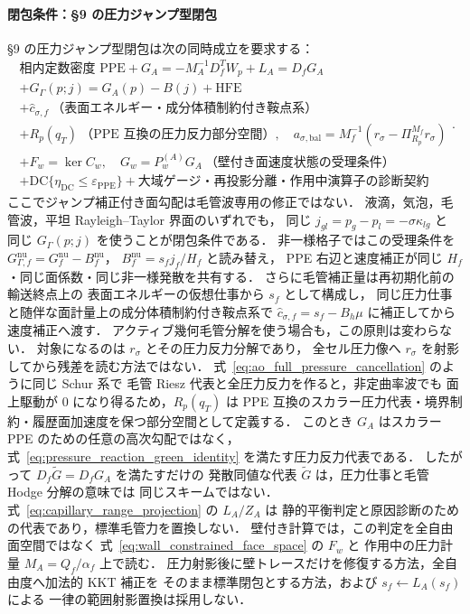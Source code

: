 \paragraph{閉包条件：§9 の圧力ジャンプ型閉包}
\label{box:ppe_design_rationale}
§9 の圧力ジャンプ型閉包は次の同時成立を要求する：
\[
  \boxed{
  \begin{gathered}
  \text{相内定数密度 PPE}
  +G_A=-M_A^{-1}D_f^TW_p
  +L_A=D_fG_A \\
  +G_\Gamma(p;j)=G_A(p)-B(j)
  +\mathrm{HFE} \\
  +\widehat c_{\sigma,f}\ \text{（表面エネルギー・成分体積制約付き鞍点系）} \\
  +R_p(q_T)\ \text{（PPE 互換の圧力反力部分空間）},\quad
   a_{\sigma,\mathrm{bal}}=M_f^{-1}(r_\sigma-\Pi^{M_f}_{R_p}r_\sigma) \\
  +F_w=\ker C_w,\quad G_w=P_w^{(A)}G_A\ \text{（壁付き面速度状態の受理条件）} \\
  +\mathrm{DC}\{\eta_{\mathrm{DC}}\le\varepsilon_{\mathrm{PPE}}\}
  +\text{大域ゲージ・再投影分離・作用中演算子の診断契約}
  \end{gathered}
  }.
\]
ここでジャンプ補正付き面勾配は毛管波専用の修正ではない．
液滴，気泡，毛管波，平坦 Rayleigh--Taylor 界面のいずれでも，
同じ $j_{gl}=p_g-p_l=-\sigma\kappa_{lg}$ と
同じ $G_\Gamma(p;j)$ を使うことが閉包条件である．
非一様格子ではこの受理条件を
$G_{\Gamma,f}^{\mathrm{nu}}=G_f^{\mathrm{nu}}-B_f^{\mathrm{nu}}$，
$B_f^{\mathrm{nu}}=s_fj_f/H_f$ と読み替え，
PPE 右辺と速度補正が同じ $H_f$・同じ面係数・同じ非一様発散を共有する．
さらに毛管補正量は再初期化前の輸送終点上の
表面エネルギーの仮想仕事から $s_f$ として構成し，
同じ圧力仕事と随伴な面計量上の成分体積制約付き鞍点系で
$\widehat c_{\sigma,f}=s_f-B_h\mu$ に補正してから速度補正へ渡す．
アクティブ幾何毛管分解を使う場合も，この原則は変わらない．
対象になるのは $r_\sigma$ とその圧力反力分解であり，
全セル圧力像へ $r_\sigma$ を射影してから残差を読む方法ではない．
式~\eqref{eq:ao_full_pressure_cancellation} のように同じ Schur 系で
毛管 Riesz 代表と全圧力反力を作ると，非定曲率波でも
面上駆動が $0$ になり得るため，$R_p(q_T)$ は
PPE 互換のスカラー圧力代表・境界制約・履歴面加速度を保つ部分空間として定義する．
このとき $G_A$ はスカラー PPE のための任意の高次勾配ではなく，
式~\eqref{eq:pressure_reaction_green_identity} を満たす圧力反力代表である．
したがって $D_f\widetilde G=D_fG_A$ を満たすだけの
発散同値な代表 $\widetilde G$ は，圧力仕事と毛管 Hodge 分解の意味では
同じスキームではない．
式~\eqref{eq:capillary_range_projection} の $L_A/Z_A$ は
静的平衡判定と原因診断のための代表であり，標準毛管力を置換しない．
壁付き計算では，この判定を全自由面空間ではなく
式~\eqref{eq:wall_constrained_face_space} の $F_w$ と
作用中の圧力計量 $M_A=Q_f/\alpha_f$ 上で読む．
圧力射影後に壁トレースだけを修復する方法，全自由度へ加法的 KKT 補正を
そのまま標準閉包とする方法，および $s_f\leftarrow L_A(s_f)$ による
一律の範囲射影置換は採用しない．

